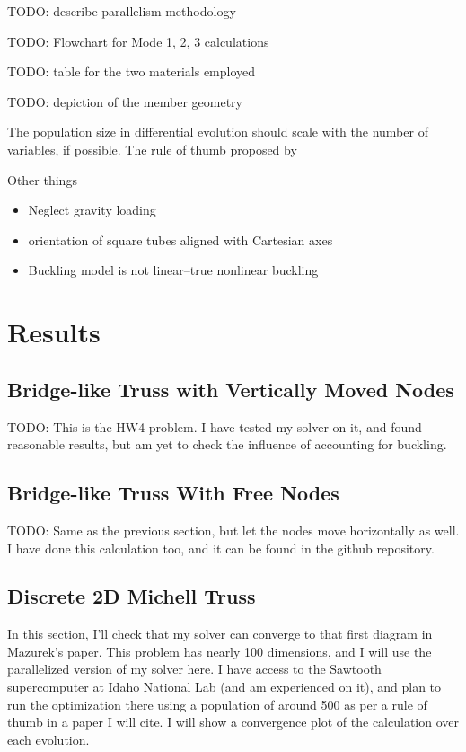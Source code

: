 \documentclass{article}
\begin{document}
TODO: describe parallelism methodology

TODO: Flowchart for Mode 1, 2, 3 calculations

TODO: table for the two materials employed

TODO: depiction of the member geometry

The population size in differential evolution should scale with the number of
variables, if possible. The rule of thumb proposed by \cite{piotrowskiReviewDifferentialEvolution2017}

Other things
\begin{itemize}
  \item Neglect gravity loading
  \item orientation of square tubes aligned with Cartesian axes
  \item Buckling model is not linear--true nonlinear buckling
\end{itemize}

\section{Results}

\subsection{Bridge-like Truss with Vertically Moved Nodes}
TODO: This is the HW4 problem. I have tested my solver on it, and found
reasonable results, but am yet to check the influence of accounting
for buckling.

\subsection{Bridge-like Truss With Free Nodes}
TODO: Same as the previous section, but let the nodes move horizontally
as well. I have done this calculation too, and it can be found
in the github repository.

\subsection{Discrete 2D Michell Truss}
In this section, I'll check that my solver can converge to that
first diagram in Mazurek's paper. This problem has nearly 100 dimensions,
and I will use the parallelized version of my solver here. I have
access to the Sawtooth supercomputer at Idaho National Lab (and am experienced
on it), and plan to run the optimization there using a population of around
500 as per a rule of thumb in a paper I will cite. I will show a convergence plot of the calculation
over each evolution.
\end{document}
